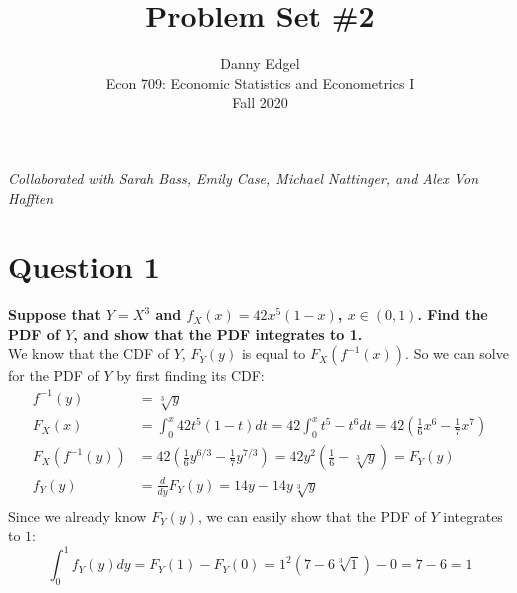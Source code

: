 \documentclass{article}
\begin{document}
\title{	Problem Set \#2 }
\author{ 	Danny Edgel 										\\ 
			Econ 709: Economic Statistics and Econometrics I	\\
			Fall 2020											\\
		}
\maketitle\thispagestyle{empty}


\noindent\textit{Collaborated with Sarah Bass, Emily Case, Michael Nattinger, and Alex Von Hafften}


\section*{Question 1}
\textbf{Suppose that $Y=X^3$ and $f_X(x)=42x^5(1-x)$, $x\in(0,1)$. Find the PDF of $Y$, and show that the PDF integrates to 1.}
\bigskip \\
We know that the CDF of $Y$, $F_Y(y)$ is equal to $F_X(f^{-1}(x))$. So we can solve for the PDF of $Y$ by first finding its CDF:
\begin{align*}
	f^{-1}(y)		&= \sqrt[3]{y}																			\\
	F_X(x)			&=\int_0^x 42t^5(1-t)dt=42\int_0^x t^5-t^6dt=42(\frac{1}{6}x^6-\frac{1}{7}x^7)						\\
	F_X(f^{-1}(y)) 	&= 42(\frac{1}{6}y^{6/3}-\frac{1}{7}y^{7/3})=42y^2(\frac{1}{6}-\sqrt[3]{y}) = F_Y(y)	\\
	f_Y(y)			&= \frac{d}{dy} F_Y(y) = 14y-14y\sqrt[3]{y}												\\
\end{align*}
Since we already know $F_Y(y)$, we can easily show that the PDF of $Y$ integrates to $1$:
\[
	\int_0^1 f_Y(y)dy = F_Y(1)-F_Y(0) = 1^2(7-6\sqrt[3]{1}) - 0 = 7-6 = 1
\]

\end{document}
